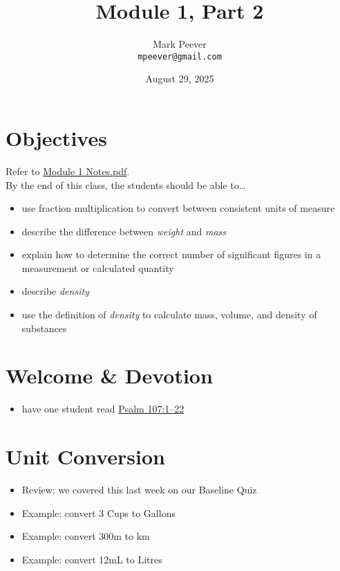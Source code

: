 \documentclass[10pt, oneside]{article}   	%
\title{Module 1, Part 2}
\author{Mark Peever\\ \texttt{mpeever@gmail.com}}
\date{August 29, 2025}
\begin{document}
\maketitle



\section*{Objectives}
Refer to \href{https://drive.google.com/file/d/1p-i3eBQ1MXrmtNDu9kW5U6uMlN-BSEsR/view?usp=sharing}{Module 1 Notes.pdf}.\\

By the end of this class, the students should be able to\ldots
\begin{itemize}
\item use fraction multiplication to convert between consistent units of measure
\item describe the difference between \emph{weight} and \emph{mass}
\item explain how to determine the correct number of significant figures in a measurement or calculated quantity
\item describe \emph{density}
\item use the definition of \emph{density} to calculate mass, volume, and density of substances
\end{itemize}

\section*{Welcome \& Devotion}
\begin{itemize}
\item have one student read \href{https://www.biblegateway.com/passage/?search=Psalm\%20107\&version=LSB}{Psalm 107:1--22}
\end{itemize}

\section*{Unit Conversion}
\begin{itemize}
\item Review: we covered this last week on our Baseline Quiz
\item Example: convert 3 Cups to Gallons
\item Example: convert 300m to km
\item Example: convert 12mL to Litres
\end{itemize}
\end{document}
